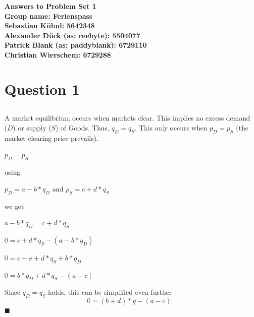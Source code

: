 \documentclass{article}
\begin{document}
\begin{center}
\LARGE \bfseries{Answers to Problem Set 1}\\
 Group name: Ferienspass\vspace{.5cm}\\
 \normalsize \normalfont
  Sebastian K\"uhnl: 5642348\\
  Alexander D\"uck (as: reebyte): 5504077\\
  Patrick Blank (as: paddyblank): 6729110\\
  Christian Wierschem: 6729288
\end{center}
\normalsize	

\section{Question 1}

\subsection{}
A market equilibrium occurs when markets clear. This implies no excess demand ($D$) or supply ($S$) of Goods. Thus, $q_D = q_S$. This only occurs when $p_D = p_S$ (the market clearing price prevails).
\begin{center} $p_D = p_S$ \end{center}
using
\begin{center} $p_D=a-b*q_D $ and $p_S=c+d*q_S$\end{center}
 we get
\begin{center} $a-b*q_D =c+d*q_S$ \end{center}
\begin{center} $0 =c+d*q_S-(a-b*q_D)$ \end{center}
\begin{center} $0 =c-a+d*q_S+b*q_D$ \end{center}
\begin{center} $0 =b*q_D+d*q_S-(a-c)$ \end{center}
Since $q_D = q_S$ holds, this can be simplified even further 
 \begin{equation} \label{First_One}0 =(b+d)*q-(a-c)\end{equation} $\blacksquare$
 
\subsection{}
\end{document}
